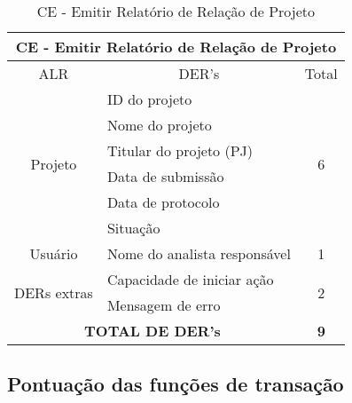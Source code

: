       \begin{table}[!h]
	\centering
	\caption{CE - Emitir Relatório de Relação de Projeto}
	\label{ce_emitir_relatorio_projeto}
	\begin{tabular}{|c|l|c|}
	\hline
	\multicolumn{3}{|c|}{CE - Emitir Relatório de Relação de Projeto}                                      \\ \hline
	ALR                                                & \multicolumn{1}{c|}{DER's}   & Total              \\ \hline
	\multirow{6}{*}{Projeto}                           & ID do projeto                & \multirow{6}{*}{6} \\ \cline{2-2}
							  & Nome do projeto              &                    \\ \cline{2-2}
							  & Titular do projeto (PJ)      &                    \\ \cline{2-2}
							  & Data de submissão            &                    \\ \cline{2-2}
							  & Data de protocolo            &                    \\ \cline{2-2}
							  & Situação                     &                    \\ \hline
	Usuário                                            & Nome do analista responsável & 1                  \\ \hline
	\multicolumn{1}{|l|}{\multirow{2}{*}{DERs extras}} & Capacidade de iniciar ação   & \multirow{2}{*}{2} \\ \cline{2-2}
	\multicolumn{1}{|l|}{}                             & Mensagem de erro             &                    \\ \hline
	\multicolumn{2}{|c|}{\textbf{TOTAL DE DER's}}                                     & \textbf{9}         \\ \hline
	\end{tabular}
	\end{table}
  
   \subsection{Pontuação das funções de transação}
   
